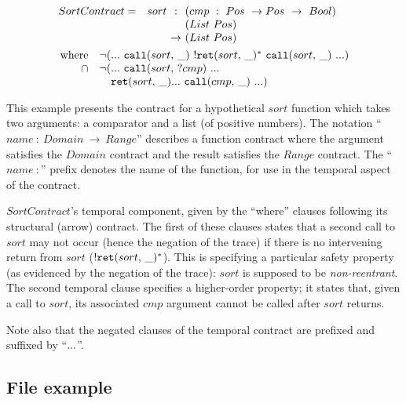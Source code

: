 \renewcommand*{\arraystretch}{1.2}
\newcommand*{\call}[1]{\scallev{#1}{\_}}
\newcommand*{\ret}[1]{\sretev{#1}{\_}}
\begin{align*}
 &\begin{array}{ l @{\quad}l@{\ } c @{\ }l }
 SortContract =
 &sort &:   &(cmp\ :\ Pos\ \to Pos\ \to\ Bool) \\
 &     &    &(List\ Pos) \\
 &     &\to &(List\ Pos) \\
 \end{array}
 \\
 &~\begin{array}{ @{~}r@{} l @{}l }
  \text{where}\quad
  &\stnot{(&\sddd~ \call{sort}~ \stmany{\snonevent{\ret{sort}}}~ \call{sort}~ \sddd)} \\
  \cap\quad
  &\stnot{(&\sddd~ \scallev{sort}{?cmp}~ \sddd~ \\
  &&\ret{sort} \sddd~ \call{cmp}~ \sddd)}
 \end{array}
\end{align*}

This example presents the contract for a hypothetical $sort$ function which takes two arguments: a comparator and a list (of positive numbers).
%
The notation ``$\mathit{name}\ :\ Domain\ \to\ Range$'' describes a function contract where the argument satisfies the $Domain$ contract and the result satisfies the $Range$ contract.
%
The ``$\mathit{name}\ :$'' prefix denotes the name of the function, for use in the temporal aspect of the contract.

$SortContract$'s temporal component, given by the ``where'' clauses following its structural (arrow) contract.
%
The first of these clauses states that a second call to $sort$ may not occur (hence the negation of the trace) if there is no intervening return from $sort$ ($\stmany{\snonevent{\ret{sort}}}$).
%
This is specifying a particular safety property (as evidenced by the negation of the trace): $sort$ is supposed to be \emph{non-reentrant}.
%
The second temporal clause specifies a higher-order property; it states that, given a call to $sort$, its associated $cmp$ argument cannot be called after $sort$ returns.

Note also that the negated clauses of the temporal contract are prefixed and suffixed by ``${\tt ...}$''.

\subsection{File example} \label{sec:file}

